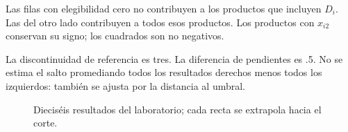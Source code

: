 \documentclass[11pt,a4paper]{article}
\begin{document}
Las filas con elegibilidad cero no contribuyen
a los productos que incluyen \(D_i\).
Las del otro lado contribuyen
a todos esos productos.
Los productos con \(x_{i2}\) conservan
su signo; los cuadrados son no negativos.

La discontinuidad de referencia es tres.
La diferencia de pendientes es .5.
No se estima el salto promediando
todos los resultados derechos menos
todos los izquierdos: también se ajusta
por la distancia al umbral.

\begin{figure}[H]\centering
{}
\caption{Dieciséis resultados del laboratorio; cada recta se extrapola hacia el corte.}
\end{figure}

\clearpage
\end{document}
